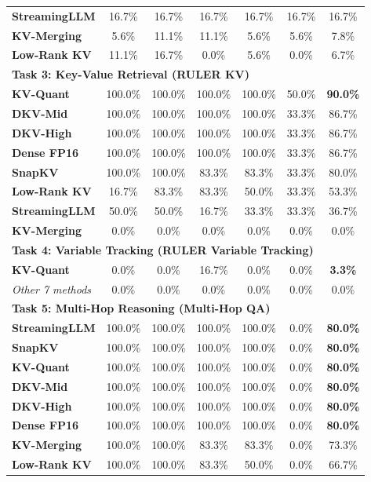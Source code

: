 \documentclass[10pt]{article}
\theoremstyle{definition}
\begin{document}
\begin{table}[h]
\begin{tabular}{lcccccc}
\textbf{StreamingLLM} & 16.7\% & 16.7\% & 16.7\% & 16.7\% & 16.7\% & 16.7\% \\
\textbf{KV-Merging} & 5.6\% & 11.1\% & 11.1\% & 5.6\% & 5.6\% & 7.8\% \\
\textbf{Low-Rank KV} & 11.1\% & 16.7\% & 0.0\% & 5.6\% & 0.0\% & 6.7\% \\
\midrule
\multicolumn{7}{l}{\textbf{Task 3: Key-Value Retrieval (RULER KV)}} \\
\textbf{KV-Quant} & 100.0\% & 100.0\% & 100.0\% & 100.0\% & 50.0\% & \textbf{90.0\%} \\
\textbf{DKV-Mid} & 100.0\% & 100.0\% & 100.0\% & 100.0\% & 33.3\% & 86.7\% \\
\textbf{DKV-High} & 100.0\% & 100.0\% & 100.0\% & 100.0\% & 33.3\% & 86.7\% \\
\textbf{Dense FP16} & 100.0\% & 100.0\% & 100.0\% & 100.0\% & 33.3\% & 86.7\% \\
\textbf{SnapKV} & 100.0\% & 100.0\% & 83.3\% & 83.3\% & 33.3\% & 80.0\% \\
\textbf{Low-Rank KV} & 16.7\% & 83.3\% & 83.3\% & 50.0\% & 33.3\% & 53.3\% \\
\textbf{StreamingLLM} & 50.0\% & 50.0\% & 16.7\% & 33.3\% & 33.3\% & 36.7\% \\
\textbf{KV-Merging} & 0.0\% & 0.0\% & 0.0\% & 0.0\% & 0.0\% & 0.0\% \\
\midrule
\multicolumn{7}{l}{\textbf{Task 4: Variable Tracking (RULER Variable Tracking)}} \\
\textbf{KV-Quant} & 0.0\% & 0.0\% & 16.7\% & 0.0\% & 0.0\% & \textbf{3.3\%} \\
\textit{Other 7 methods} & 0.0\% & 0.0\% & 0.0\% & 0.0\% & 0.0\% & 0.0\% \\
\midrule
\multicolumn{7}{l}{\textbf{Task 5: Multi-Hop Reasoning (Multi-Hop QA)}} \\
\textbf{StreamingLLM} & 100.0\% & 100.0\% & 100.0\% & 100.0\% & 0.0\% & \textbf{80.0\%} \\
\textbf{SnapKV} & 100.0\% & 100.0\% & 100.0\% & 100.0\% & 0.0\% & \textbf{80.0\%} \\
\textbf{KV-Quant} & 100.0\% & 100.0\% & 100.0\% & 100.0\% & 0.0\% & \textbf{80.0\%} \\
\textbf{DKV-Mid} & 100.0\% & 100.0\% & 100.0\% & 100.0\% & 0.0\% & \textbf{80.0\%} \\
\textbf{DKV-High} & 100.0\% & 100.0\% & 100.0\% & 100.0\% & 0.0\% & \textbf{80.0\%} \\
\textbf{Dense FP16} & 100.0\% & 100.0\% & 100.0\% & 100.0\% & 0.0\% & \textbf{80.0\%} \\
\textbf{KV-Merging} & 100.0\% & 100.0\% & 83.3\% & 83.3\% & 0.0\% & 73.3\% \\
\textbf{Low-Rank KV} & 100.0\% & 100.0\% & 83.3\% & 50.0\% & 0.0\% & 66.7\% \\
\bottomrule
\end{tabular}
\end{table}
\end{document}
